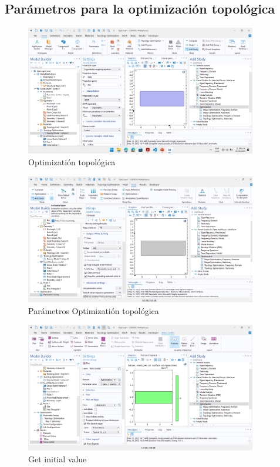 \documentclass{article}
\theoremstyle{mytheoremstyle}
\theoremstyle{mytheoremstyle}
\theoremstyle{myproblemstyle}
\begin{document}
            \subsection{Parámetros para la optimización topológica}
             \begin{figure}[H]
              \centering
              \includegraphics[width=0.9\textwidth]{opt.png}
              \caption{Optimizatión topológica}
              \label{fig:imagen_x}
            \end{figure}
              \begin{figure}[H]
              \centering
              \includegraphics[width=0.9\textwidth]{Param.png}
              \caption{Parámetros Optimizatión topológica}
              \label{fig:imagen_x}
            \end{figure}
            \begin{figure}[H]
              \centering
              \includegraphics[width=0.9\textwidth]{initi.png}
              \caption{Get initial value}
              \label{fig:imagen_x}
            \end{figure}
\end{document}
